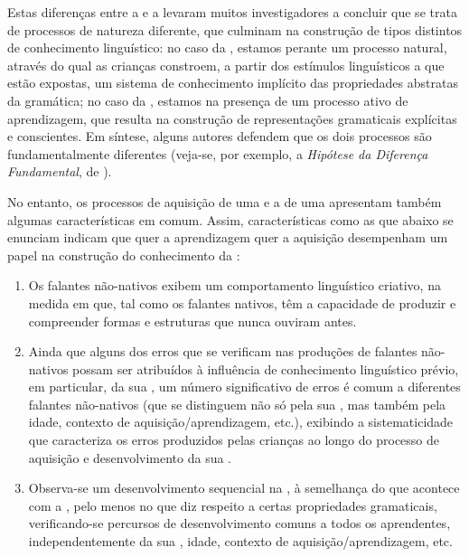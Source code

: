 \documentclass[output=paper]{LSP/langsci}
\begin{document}
Estas diferenças entre a  e a  levaram muitos investigadores a concluir que se trata de processos de natureza diferente, que culminam na construção de tipos distintos de conhecimento linguístico: no caso da , estamos perante um processo natural, através do qual as crianças constroem, a partir dos estímulos linguísticos a que estão expostas, um sistema de conhecimento implícito das propriedades abstratas da gramática; no caso da , estamos na presença de um processo ativo de aprendizagem, que resulta na construção de representações gramaticais explícitas e conscientes. Em síntese, alguns autores defendem que os dois processos são fundamentalmente diferentes (veja-se, por exemplo, a \textit{Hipótese da Diferença Fundamental}, de \citealt{bley-vroman1989}).

No entanto, os processos de aquisição de uma  e a de uma  apresentam também algumas características em comum. Assim, características como as que abaixo se enunciam indicam que quer a aprendizagem quer a aquisição desempenham um papel na construção do conhecimento da :

\begin{enumerate}
\item Os falantes não-nativos exibem um comportamento linguístico criativo, na medida em que, tal como os falantes nativos, têm a capacidade de produzir e compreender formas e estruturas que nunca ouviram antes.

\item Ainda que alguns dos erros que se verificam nas produções de falantes não-nativos possam ser atribuídos à influência de conhecimento linguístico prévio, em particular, da sua , um número significativo de erros é comum a diferentes falantes não-nativos (que se distinguem não só pela sua , mas também pela idade, contexto de aquisição/aprendizagem, etc.), exibindo a sistematicidade que caracteriza os erros produzidos pelas crianças ao longo do processo de aquisição e desenvolvimento da sua .

\item Observa-se um desenvolvimento sequencial na , à semelhança do que acontece com a , pelo menos no que diz respeito a certas propriedades gramaticais, verificando-se percursos de desenvolvimento comuns a todos os aprendentes, independentemente da sua , idade, contexto de aquisição/aprendizagem, etc.

\end{enumerate}
\end{document}
